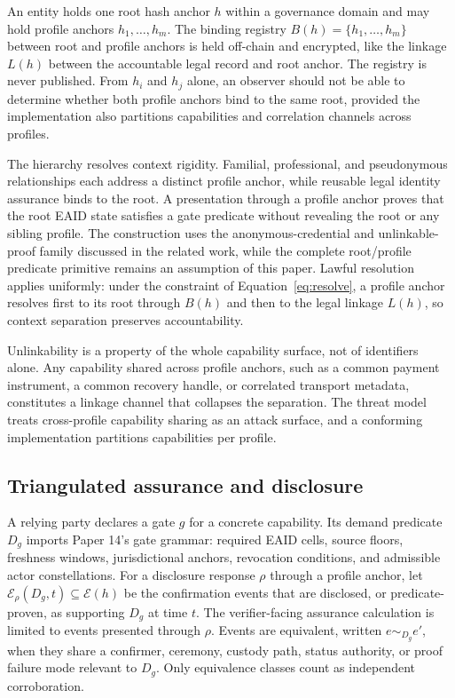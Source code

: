\documentclass[oneside,10pt]{swissi}
\begin{document}
\begin{definition}
\label{def:hierarchy}
An entity holds one root hash anchor $h$ within a governance domain and may hold profile anchors $h_1, \dots, h_m$. The binding registry $B(h) = \{h_1, \dots, h_m\}$ between root and profile anchors is held off-chain and encrypted, like the linkage $L(h)$ between the accountable legal record and root anchor. The registry is never published. From $h_i$ and $h_j$ alone, an observer should not be able to determine whether both profile anchors bind to the same root, provided the implementation also partitions capabilities and correlation channels across profiles.
\end{definition}

The hierarchy resolves context rigidity. Familial, professional, and pseudonymous relationships each address a distinct profile anchor, while reusable legal identity assurance binds to the root. A presentation through a profile anchor proves that the root EAID state satisfies a gate predicate without revealing the root or any sibling profile. The construction uses the anonymous-credential and unlinkable-proof family discussed in the related work, while the complete root/profile predicate primitive remains an assumption of this paper. Lawful resolution applies uniformly: under the constraint of Equation~\eqref{eq:resolve}, a profile anchor resolves first to its root through $B(h)$ and then to the legal linkage $L(h)$, so context separation preserves accountability.

Unlinkability is a property of the whole capability surface, not of identifiers alone. Any capability shared across profile anchors, such as a common payment instrument, a common recovery handle, or correlated transport metadata, constitutes a linkage channel that collapses the separation. The threat model treats cross-profile capability sharing as an attack surface, and a conforming implementation partitions capabilities per profile.

\subsection{Triangulated assurance and disclosure}

A relying party declares a gate $g$ for a concrete capability. Its demand predicate $D_g$ imports Paper 14's gate grammar: required EAID cells, source floors, freshness windows, jurisdictional anchors, revocation conditions, and admissible actor constellations. For a disclosure response $\rho$ through a profile anchor, let $\mathcal{E}_\rho(D_g,t) \subseteq \mathcal{E}(h)$ be the confirmation events that are disclosed, or predicate-proven, as supporting $D_g$ at time $t$. The verifier-facing assurance calculation is limited to events presented through $\rho$. Events are equivalent, written $e \sim_{D_g} e'$, when they share a confirmer, ceremony, custody path, status authority, or proof failure mode relevant to $D_g$. Only equivalence classes count as independent corroboration.
\end{document}
